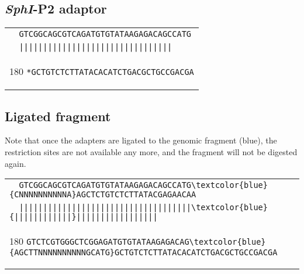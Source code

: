 \documentclass[a4paper,12pt]{article}
\begin{document}
\begin{flushleft}
\subsection*{\emph{SphI}-P2 adaptor}

\begin{tabular}{l}
\verb+  GTCGGCAGCGTCAGATGTGTATAAGAGACAGCCATG+\\
\verb+  ||||||||||||||||||||||||||||||||+\\[-8pt]
   \begin{turn}{180}
   \verb+*GCTGTCTCTTATACACATCTGACGCTGCCGACGA+
   \end{turn}
\\
\end{tabular}
\vspace*{0.3cm}

\subsection*{Ligated fragment}
Note that once the adapters are ligated to the genomic fragment (blue), the restriction sites are not available any more, and the fragment will not be digested again.

\begin{tabular}{l}
\Verb+  GTCGGCAGCGTCAGATGTGTATAAGAGACAGCCATG\textcolor{blue}{CNNNNNNNNNNA}AGCTCTGTCTCTTATACGAGAACAA+\\[-6pt]
\Verb+  ||||||||||||||||||||||||||||||||||||\textcolor{blue}{||||||||||||}|||||||||||||||||+\\[-10pt]
   \begin{turn}{180}
   \Verb+GTCTCGTGGGCTCGGAGATGTGTATAAGAGACAG\textcolor{blue}{AGCTTNNNNNNNNNNGCATG}GCTGTCTCTTATACACATCTGACGCTGCCGACGA+
   \end{turn}
\\
\end{tabular}
\vspace*{0.3cm}


\end{flushleft}
\end{document}
